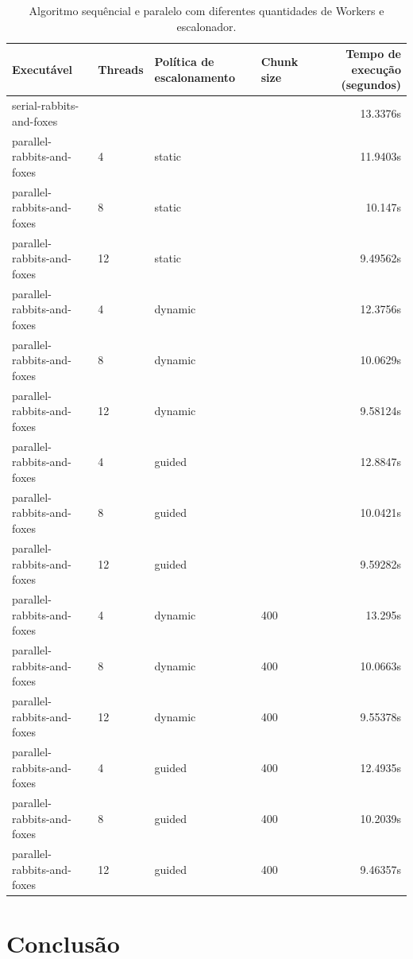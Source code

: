 \documentclass[12pt]{article}
\begin{document}
\begin{table}[H]
	\tiny
	\begin{center}
\begin{tabular}{|l|l|l|l|r|}
\hline
 Executável   & Threads   & Política de escalonamento      & Chunk size    & Tempo de execução (segundos)  \\
 \hline\hline
 serial-rabbits-and-foxes   &    &       &     & 13.3376s  \\
 \hline
 parallel-rabbits-and-foxes & 4  & static &     & 11.9403s  \\
 parallel-rabbits-and-foxes & 8  & static &     & 10.147s   \\
 parallel-rabbits-and-foxes & 12 & static &     &  9.49562s \\\hline
 parallel-rabbits-and-foxes & 4  & dynamic&     & 12.3756s  \\
 parallel-rabbits-and-foxes & 8  & dynamic&     & 10.0629s  \\
 parallel-rabbits-and-foxes & 12 & dynamic&     &  9.58124s \\\hline
 parallel-rabbits-and-foxes & 4  & guided &     & 12.8847s  \\
 parallel-rabbits-and-foxes & 8  & guided &     & 10.0421s  \\
 parallel-rabbits-and-foxes & 12 & guided &     &  9.59282s \\
 \hline
 parallel-rabbits-and-foxes & 4  & dynamic& 400 & 13.295s   \\
 parallel-rabbits-and-foxes & 8  & dynamic& 400 & 10.0663s  \\
 parallel-rabbits-and-foxes & 12 & dynamic& 400 &  9.55378s \\\hline
 parallel-rabbits-and-foxes & 4  & guided&400  & 12.4935s  \\
 parallel-rabbits-and-foxes & 8  & guided&400  & 10.2039s  \\
 parallel-rabbits-and-foxes & 12 & guided&400  &  9.46357s \\
\hline
\end{tabular}
\end{center}

	\caption{Algoritmo sequêncial e paralelo com diferentes quantidades de Workers e escalonador.}
	\label{tab:resultados}
\end{table}


\section{Conclusão}
\end{document}
